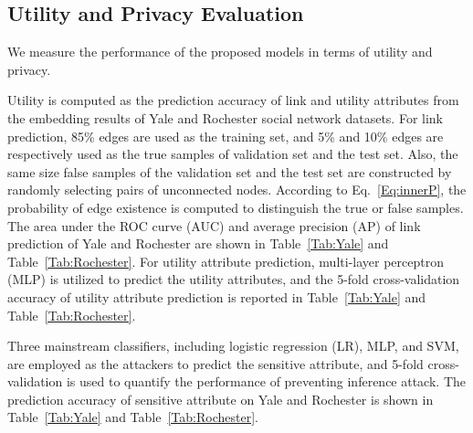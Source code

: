 \documentclass{article}
\begin{document}
\subsection{Utility and Privacy Evaluation}
We measure the performance of the proposed models in terms of utility and privacy.


Utility is computed as the prediction accuracy of link and utility attributes from the embedding results of Yale and Rochester social network datasets.
For link prediction, 85\% edges are used as the training set, and 5\% and 10\% edges are respectively used as the true samples of validation set and the test set. Also, the same size false samples of the validation set and the test set are constructed by randomly selecting pairs of unconnected nodes.
According to Eq.~\ref{Eq:innerP}, the probability of edge existence is computed to distinguish the true or false samples. The area under the ROC curve (AUC) and average precision (AP) of link prediction of Yale and Rochester are shown  in Table~\ref{Tab:Yale} and Table~\ref{Tab:Rochester}.
For utility attribute prediction, multi-layer perceptron (MLP) is utilized to predict the utility attributes, and the 5-fold cross-validation accuracy of utility attribute prediction is reported in Table~\ref{Tab:Yale} and Table~\ref{Tab:Rochester}.



Three mainstream classifiers, including logistic regression (LR), MLP, and SVM, are employed as the attackers to predict the sensitive attribute, and 5-fold cross-validation is used to quantify the performance of preventing inference attack. The prediction accuracy of sensitive attribute on Yale and Rochester is shown in Table~\ref{Tab:Yale} and Table~\ref{Tab:Rochester}.
\end{document}
